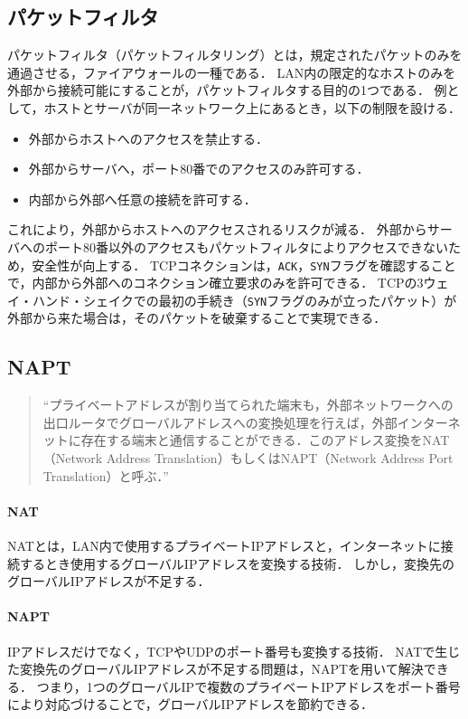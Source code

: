 \subsection{パケットフィルタ}
パケットフィルタ（パケットフィルタリング）とは，規定されたパケットのみを通過させる，ファイアウォールの一種である．
LAN内の限定的なホストのみを外部から接続可能にすることが，パケットフィルタする目的の1つである．
例として，ホストとサーバが同一ネットワーク上にあるとき，以下の制限を設ける．
\begin{itemize}
    \item 外部からホストへのアクセスを禁止する．
    \item 外部からサーバへ，ポート80番でのアクセスのみ許可する．
    \item 内部から外部へ任意の接続を許可する．
\end{itemize}
これにより，外部からホストへのアクセスされるリスクが減る．
外部からサーバへのポート80番以外のアクセスもパケットフィルタによりアクセスできないため，安全性が向上する．
TCPコネクションは，\texttt{ACK}，\texttt{SYN}フラグを確認することで，内部から外部へのコネクション確立要求のみを許可できる．
TCPの3ウェイ・ハンド・シェイクでの最初の手続き（\texttt{SYN}フラグのみが立ったパケット）が外部から来た場合は，そのパケットを破棄することで実現できる\cite[p.343]{マスタリングTCPIP}．
\subsection{NAPT}
\begin{quote}
    ``プライベートアドレスが割り当てられた端末も，外部ネットワークへの出口ルータでグローバルアドレスへの変換処理を行えば，外部インターネットに存在する端末と通信することができる．このアドレス変換をNAT（Network Address Translation）もしくはNAPT（Network Address Port Translation）と呼ぶ．''\hfill\cite[p.97]{情報通信ネットワーク}
\end{quote}
\paragraph{NAT}
NATとは，LAN内で使用するプライベートIPアドレスと，インターネットに接続するとき使用するグローバルIPアドレスを変換する技術．
しかし，変換先のグローバルIPアドレスが不足する．
\paragraph{NAPT}
IPアドレスだけでなく，TCPやUDPのポート番号も変換する技術．
NATで生じた変換先のグローバルIPアドレスが不足する問題は，NAPTを用いて解決できる．
つまり，1つのグローバルIPで複数のプライベートIPアドレスをポート番号により対応づけることで，グローバルIPアドレスを節約できる．

